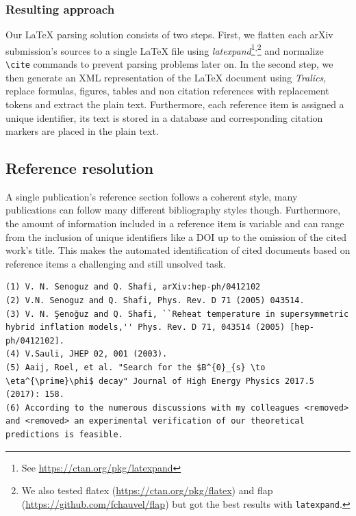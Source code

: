 \subsubsection{Resulting approach}
Our \LaTeX{} parsing solution consists of two steps. First, we flatten each arXiv submission's sources to a single \LaTeX{} file using \textit{latexpand}\footnote{See \url{https://ctan.org/pkg/latexpand}}\textsuperscript{,}\footnote{We also tested flatex (\url{https://ctan.org/pkg/flatex}) and flap (\url{https://github.com/fchauvel/flap}) but got the best results with \texttt{latexpand}.} and normalize \texttt{\textbackslash cite} commands to prevent parsing problems later on. In the second step, we then generate an XML representation of the \LaTeX{} document using \textit{Tralics}, replace formulas, figures, tables and non citation references with replacement tokens and extract the plain text. Furthermore, each reference item is assigned a unique identifier, its text is stored in a database and corresponding citation markers are placed in the plain text.

\subsection{Reference resolution}
A single publication's reference section follows a coherent style, many publications can follow many different bibliography styles though. Furthermore, the amount of information included in a reference item is variable and can range from the inclusion of unique identifiers like a DOI up to the omission of the cited work's title. This makes the automated identification of cited documents based on reference items a challenging and still unsolved task\cite{Nasar2018}.


\begin{lstlisting}[caption={Examples of reference items.}]
(1) V. N. Senoguz and Q. Shafi, arXiv:hep-ph/0412102
(2) V.N. Senoguz and Q. Shafi, Phys. Rev. D 71 (2005) 043514.
(3) V. N. Şenoğuz and Q. Shafi, ``Reheat temperature in supersymmetric hybrid inflation models,'' Phys. Rev. D 71, 043514 (2005) [hep-ph/0412102].
(4) V.Sauli, JHEP 02, 001 (2003).
(5) Aaij, Roel, et al. "Search for the $B^{0}_{s} \to \eta^{\prime}\phi$ decay" Journal of High Energy Physics 2017.5 (2017): 158.
(6) According to the numerous discussions with my colleagues <removed> and <removed> an experimental verification of our theoretical predictions is feasible.
\end{lstlisting} %

